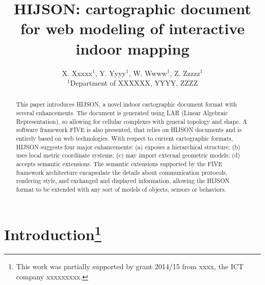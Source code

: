 \documentclass[]{egpubl}
\title[HIJSON: interactive indoor mapping]{HIJSON: cartographic document for web modeling 
of interactive indoor mapping}
\author[X. Xxxxx, Y. Yyyy, W. Wwww, \& Z. Zzzzz]
       {X. Xxxxx$^{1}$, Y. Yyyy$^{1}$, W. Wwww$^{1}$, Z. Zzzzz$^{1}$
        \\
      $^1$Department of XXXXXX, YYYY, ZZZZ
       }
\begin{document}

\maketitle

\begin{abstract} This paper introduces HIJSON, a novel indoor cartographic document
format with several enhancements. The document is generated using LAR (Linear Algebraic Representation), so allowing for cellular complexes with general topology and shape. 
A software framework FIVE is also presented, that relies on HIJSON
documents and is entirely based on web technologies. With respect to current
cartographic formats, HIJSON suggests four major enhancements: (a) exposes a
hierarchical structure; (b) uses local metric coordinate systems; (c) may
import external geometric models; (d) accepts semantic extensions. The
semantic extensions supported by the FIVE framework architecture encapsulate
the details about communication protocols, rendering style, and exchanged and
displayed information, allowing the HIJSON format to be extended with any sort
of models of objects, sensors or behaviors. 
\end{abstract}




\section{Introduction\footnote{This work was partially
supported by grant 2014/15 from  xxxx, the ICT company xxxxxxxxx.}}
\end{document}
